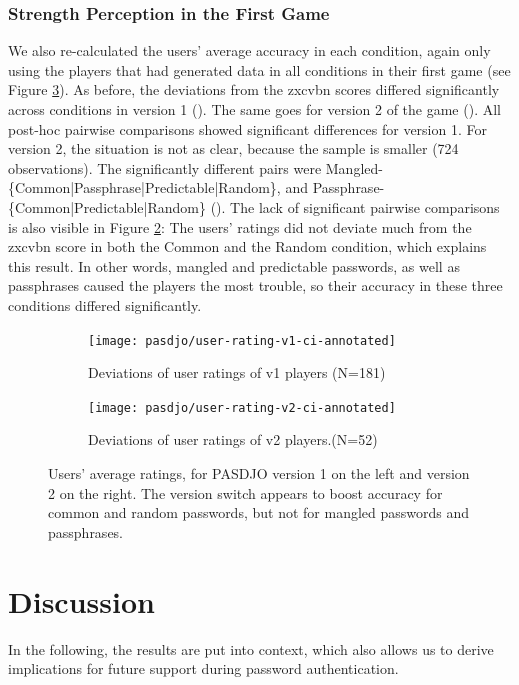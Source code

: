 \subsubsection{Strength Perception in the First Game}
We also re-calculated the users' average accuracy in each condition, again only using the players that had generated data in all conditions in their first game (see Figure \ref{fig:pasdjo:v1-v2-deviations}). As before, the deviations from the zxcvbn scores differed significantly across conditions in version 1 (). The same goes for version 2 of the game (). All post-hoc pairwise comparisons showed significant differences  for version 1. For version 2, the situation is not as clear, because the sample is smaller (724 observations). The significantly different pairs were Mangled-\{Common|Passphrase|Predictable|Random\}, and Passphrase-\{Common|Predictable|Random\} (). The lack of significant pairwise comparisons is also visible in Figure \ref{fig:pasdjo:v2-performance}: The users' ratings did not deviate much from the zxcvbn score in both the Common and the Random condition, which explains this result. In other words, mangled and predictable passwords, as well as passphrases caused the players the most trouble, so their accuracy in these three conditions differed significantly. 
\begin{figure}[htbp]
	\begin{subfigure}[t]{0.49\linewidth}
		\texttt{[image: pasdjo/user-rating-v1-ci-annotated]}
		\caption{\label{fig:pasdjo:1y-performance}Deviations of user ratings of v1 players (N=181)}
	\end{subfigure}
	\begin{subfigure}[t]{0.49\linewidth}
		\texttt{[image: pasdjo/user-rating-v2-ci-annotated]}
		\caption{\label{fig:pasdjo:v2-performance}Deviations of user ratings of v2 players.(N=52)}
	\end{subfigure}
	\caption{\label{fig:pasdjo:v1-v2-deviations} Users' average ratings, for PASDJO version 1 on the left and version 2 on the right. The version switch appears to boost accuracy for common and random passwords, but not for mangled passwords and passphrases.}
\end{figure}




\section{Discussion}
In the following, the results are put into context, which also allows us to derive implications for future support during password authentication. 
